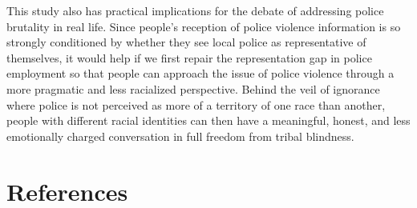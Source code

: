\documentclass[
  12pt,
]{article}
\begin{document}
This study also has practical implications for the debate of addressing
police brutality in real life. Since people's reception of police
violence information is so strongly conditioned by whether they see
local police as representative of themselves, it would help if we first
repair the representation gap in police employment so that people can
approach the issue of police violence through a more pragmatic and less
racialized perspective. Behind the veil of ignorance where police is not
perceived as more of a territory of one race than another, people with
different racial identities can then have a meaningful, honest, and less
emotionally charged conversation in full freedom from tribal blindness.

\hypertarget{references}{%
\section*{References}\label{references}}
\end{document}
